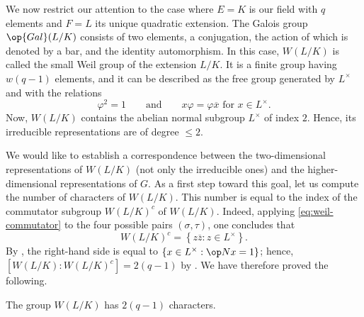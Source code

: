 \documentclass[../main.tex]{subfiles}
\begin{document}
We now restrict our attention to the case where $E=K$ is our field with $q$ elements and $F=L$ its unique quadratic extension. The Galois group $\op{Gal}(L/K)$ consists of two elements, a conjugation, the action of which is denoted by a bar, and the identity automorphism. In this case, $W(L/K)$ is called the small Weil group of the extension $L/K$. It is a finite group having $w(q-1)$ elements, and it can be described as the free group generated by $L^\times$ and with the relations
\begin{equation}
	\varphi^2=1\qquad\text{and}\qquad x\varphi=\varphi\overline x\text{ for }x\in L^\times. \label{eq:weil-relations}
\end{equation}
Now, $W(L/K)$ contains the abelian normal subgroup $L^\times$ of index $2$. Hence, its irreducible representations are of degree $\le2$.

We would like to establish a correspondence between the two-dimensional representations of $W(L/K)$ (not only the irreducible ones) and the higher-dimensional representations of $G$. As a first step toward this goal, let us compute the number of characters of $W(L/K)$. This number is equal to the index of the commutator subgroup $W(L/K)^c$ of $W(L/K)$. Indeed, applying \eqref{eq:weil-commutator} to the four possible pairs $(\sigma,\tau)$, one concludes that
\begin{equation}
	W(L/K)^c=\left\{z\overline z:z\in L^\times\right\}. \label{eq:all-weil-commutators}
\end{equation}
By , the right-hand side is equal to $\left\{x\in L^\times:\op Nx=1\right\}$; hence, $\left[W(L/K):W(L/K)^c\right]=2(q-1)$ by . We have therefore proved the following.
\begin{lemma}
	The group $W(L/K)$ has $2(q-1)$ characters.
\end{lemma}
\end{document}
